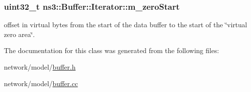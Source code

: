 \subsubsection[{\texorpdfstring{m\+\_\+zero\+Start}{m_zeroStart}}]{\setlength{\rightskip}{0pt plus 5cm}uint32\+\_\+t ns3\+::\+Buffer\+::\+Iterator\+::m\+\_\+zero\+Start\hspace{0.3cm}{\ttfamily [private]}}\hypertarget{classns3_1_1Buffer_1_1Iterator_aa1d37de1fc02ff0bf9efde8ea6ee5097}{}\label{classns3_1_1Buffer_1_1Iterator_aa1d37de1fc02ff0bf9efde8ea6ee5097}
offset in virtual bytes from the start of the data buffer to the start of the \char`\"{}virtual zero area\char`\"{}. 

The documentation for this class was generated from the following files\+:\begin{DoxyCompactItemize}
\item 
network/model/\hyperlink{buffer_8h}{buffer.\+h}\item 
network/model/\hyperlink{buffer_8cc}{buffer.\+cc}\end{DoxyCompactItemize}
